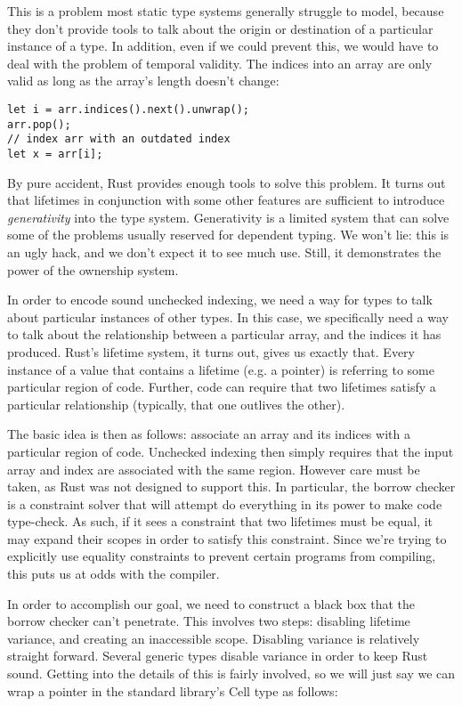 This is a problem most static type systems generally struggle to model, because
they don't provide tools to talk about the origin or destination of a particular
instance of a type. In addition, even if we could prevent this, we would have to
deal with the problem of temporal validity. The indices into an array are only
valid as long as the array's length doesn't change:

\begin{verbatim}
let i = arr.indices().next().unwrap();
arr.pop();
// index arr with an outdated index
let x = arr[i];
\end{verbatim}

By pure accident, Rust provides enough tools to solve
this problem. It turns out that lifetimes in conjunction with some other features
are sufficient to introduce \emph{generativity} into the type system. Generativity is
a limited system that can solve some of the problems usually reserved for
dependent typing. We won't lie: this is an ugly hack, and we don't expect it
to see much use. Still, it demonstrates the power of the ownership system.

In order to encode sound unchecked indexing, we need a way for types to talk about
particular instances of other types. In this case, we specifically need a way
to talk about the relationship between a particular array, and the indices it has
produced. Rust's lifetime system, it turns out, gives us exactly that. Every
instance of a value that contains a lifetime (e.g. a pointer) is referring to
some particular region of code. Further, code can require that two lifetimes
satisfy a particular relationship (typically, that one outlives the other).

The basic idea is then as follows: associate an array and its indices with
a particular region of code. Unchecked indexing then simply requires that the
input array and index are associated with the same region.
However care must be taken, as Rust was not designed to support this. In
particular, the borrow checker is a constraint solver that will attempt do
everything in its power to make code type-check. As such, if it sees
a constraint that two lifetimes must be equal, it may expand their scopes in
order to satisfy this constraint. Since we're trying to explicitly use equality
constraints to prevent certain programs from compiling, this puts us at odds
with the compiler.

In order to accomplish our goal, we need to construct a black box that the
borrow checker can't penetrate. This involves two steps: disabling lifetime variance,
and creating an inaccessible scope. Disabling variance is relatively straight
forward. Several generic types disable variance in order to keep Rust sound.
Getting into the details of this is fairly involved, so we will just
say we can wrap a pointer in the standard library's Cell type as follows:

